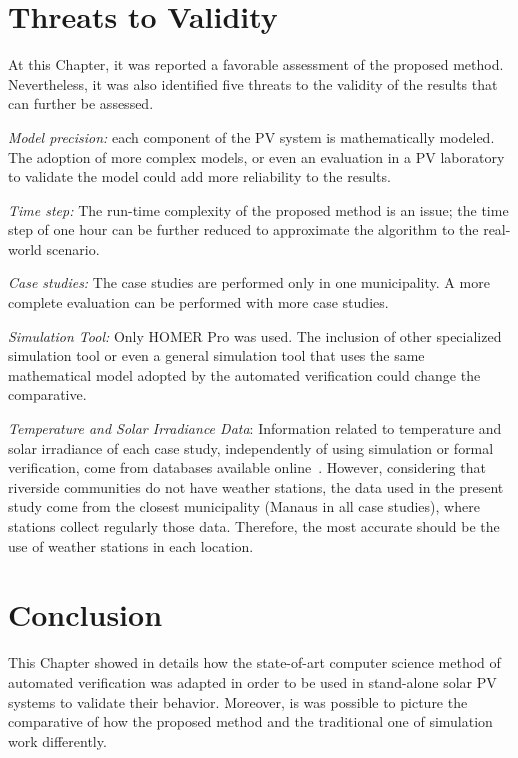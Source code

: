 \section{Threats to Validity}

At this Chapter, it was reported a favorable assessment of the proposed method. %
Nevertheless, it was also identified five threats to the validity of the results that can further be assessed.

\textit{Model precision:} each component of the PV system is mathematically modeled. %
The adoption of more complex models, or even an evaluation in a PV laboratory to validate the model could add more reliability to the results.

\textit{Time step:} The run-time complexity of the proposed method is an issue; the time step of one hour can be further reduced to approximate the algorithm to the real-world scenario.

\textit{Case studies:} The case studies are performed only in one municipality. A more complete evaluation can be performed with more case studies.

\textit{Simulation Tool:} Only HOMER Pro was used. The inclusion of other specialized simulation tool or even a general simulation tool that uses the same mathematical model adopted by the automated verification could change the comparative.

\textit{Temperature and Solar Irradiance Data}: Information related to temperature and solar irradiance of each case study, independently of using simulation or formal verification, come from databases available online~\cite{Temperature, Irradiance}. However, considering that riverside communities do not have weather stations, the data used in the present study come from the closest municipality (Manaus in all case studies), where stations collect regularly those data. Therefore, the most accurate should be the use of weather stations in each location.

\section{Conclusion}

This Chapter showed in details how the state-of-art computer science method of automated verification was adapted in order to be used in stand-alone solar PV systems to validate their behavior. Moreover, is was possible to picture the comparative of how the proposed method and the traditional one of simulation work differently.

